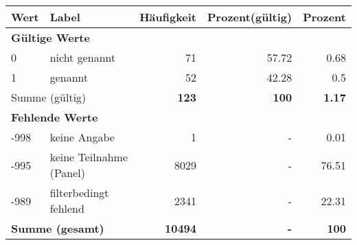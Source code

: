      \begin{longtable}{lXrrr}
     \toprule
     \textbf{Wert} & \textbf{Label} & \textbf{Häufigkeit} & \textbf{Prozent(gültig)} & \textbf{Prozent} \\
     \endhead
     \midrule
     \multicolumn{5}{l}{\textbf{Gültige Werte}}\\

     0 &
     \multicolumn{1}{X}{ nicht genannt   } &


       \num{71} &
       \num[round-mode=places,round-precision=2]{57.72} &
         \num[round-mode=places,round-precision=2]{0.68} \\

     1 &
     \multicolumn{1}{X}{ genannt   } &


       \num{52} &
       \num[round-mode=places,round-precision=2]{42.28} &
         \num[round-mode=places,round-precision=2]{0.5} \\
     \midrule
     \multicolumn{2}{l}{Summe (gültig)} &
       \textbf{\num{123}} &
     \textbf{\num{100}} &
       \textbf{\num[round-mode=places,round-precision=2]{1.17}} \\
     \multicolumn{5}{l}{\textbf{Fehlende Werte}}\\
       -998 &
       keine Angabe &
         \num{1} &
        - &
         \num[round-mode=places,round-precision=2]{0.01} \\
       -995 &
       keine Teilnahme (Panel) &
         \num{8029} &
        - &
         \num[round-mode=places,round-precision=2]{76.51} \\
       -989 &
       filterbedingt fehlend &
         \num{2341} &
        - &
         \num[round-mode=places,round-precision=2]{22.31} \\
     \midrule
     \multicolumn{2}{l}{\textbf{Summe (gesamt)}} &
          \textbf{\num{10494}} &
        \textbf{-} &
        \textbf{\num{100}} \\
     \bottomrule
     \end{longtable}
     
